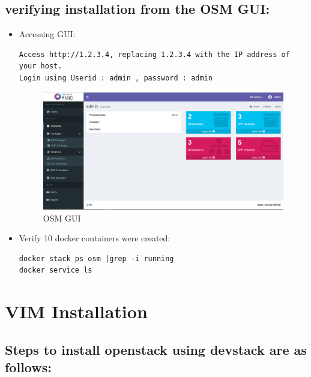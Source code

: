 \subsection{verifying installation from the OSM GUI:}
\begin{itemize}
\item Accessing GUI:
\begin{lstlisting} 
Access http://1.2.3.4, replacing 1.2.3.4 with the IP address of your host.
Login using Userid : admin , password : admin
\end{lstlisting}

\begin{figure} [H]
	\centering
	\includegraphics[width=0.5\linewidth]{figures/Sh1}
	\caption{OSM GUI}
\end{figure}

\item Verify 10 docker containers were created:

\begin{lstlisting} 
docker stack ps osm |grep -i running
docker service ls
\end{lstlisting}

\end{itemize}

\section{VIM Installation}

\subsection{Steps to install openstack using devstack are as follows:}

